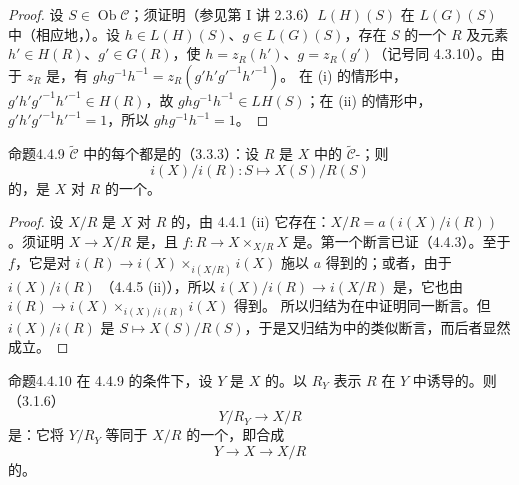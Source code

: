 \begin{proof}
设 $S\in\operatorname{Ob}\mathcal C$；须证明（参见第 I 讲 2.3.6）$L(H)(S)$ 在 $L(G)(S)$ 中（相应地，）。设 $h\in L(H)(S)$、$g\in L(G)(S)$，存在 $S$ 的一个 $R$ 及元素 $h'\in H(R)$、$g'\in G(R)$，使 $h=z_R(h')$、$g=z_R(g')$（记号同 4.3.10）。由于 $z_R$ 是，有 $ghg^{-1}h^{-1}=z_R(g'h'g'^{-1}h'^{-1})$。
在 (i) 的情形中，$g'h'g'^{-1}h'^{-1}\in H(R)$，故 $ghg^{-1}h^{-1}\in LH(S)$；在 (ii) 的情形中，$g'h'g'^{-1}h'^{-1}=1$，所以 $ghg^{-1}h^{-1}=1$。
\end{proof}
\begin{SGAresult}{命题}{4.4.9}
$\widetilde{\mathcal C}$ 中的每个都是的（3.3.3）：设 $R$ 是 $X$ 中的 $\widetilde{\mathcal C}$-；则
\[
i(X)/i(R):S\longmapsto X(S)/R(S)
\]
的，是 $X$ 对 $R$ 的一个。
\end{SGAresult}
\begin{proof}
设 $X/R$ 是 $X$ 对 $R$ 的，由 4.4.1 (ii) 它存在：$X/R=a(i(X)/i(R))$。须证明 $X\to X/R$ 是，且 $f:R\to X\times_{X/R}X$ 是。第一个断言已证（4.4.3）。至于 $f$，它是对 $i(R)\to i(X)\times_{i(X/R)}i(X)$ 施以 $a$ 得到的；或者，由于 $i(X)/i(R)$ （4.4.5 (ii)），所以 $i(X)/i(R)\to i(X/R)$ 是，它也由 $i(R)\to i(X)\times_{i(X)/i(R)}i(X)$ 得到。
所以归结为在中证明同一断言。但 $i(X)/i(R)$ 是 $S\mapsto X(S)/R(S)$，于是又归结为中的类似断言，而后者显然成立。
\end{proof}
\begin{SGAresult}{命题}{4.4.10}
在 4.4.9 的条件下，设 $Y$ 是 $X$ 的。以 $R_Y$ 表示 $R$ 在 $Y$ 中诱导的。则（3.1.6）
\[
Y/R_Y\longrightarrow X/R
\]
是：它将 $Y/R_Y$ 等同于 $X/R$ 的一个，即合成
\[
Y\longrightarrow X\longrightarrow X/R
\]
的。
\end{SGAresult}
